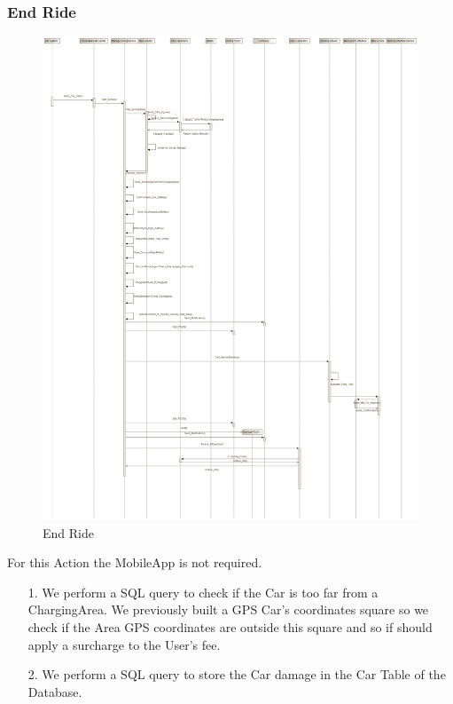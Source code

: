 \documentclass[12pt]{article}
\begin{document}
\subsubsection{End Ride}
\begin{figure}[h]
	\centering
	\includegraphics[width=\textwidth]{../Images/Sequence_Final/End_Ride}
	\caption{End Ride}
\end{figure}
For this Action the MobileApp is not required.
\begin{enumerate}
	\item[1.] We perform a SQL query to check if the Car is too far from a ChargingArea. We previously built a GPS Car’s coordinates square so we check if the Area GPS coordinates are outside this square and so if should apply a surcharge to the User’s fee.
	\item[2.] We perform a SQL query to store the Car damage in the Car Table of the Database.
\end{enumerate}
\clearpage
\end{document}

